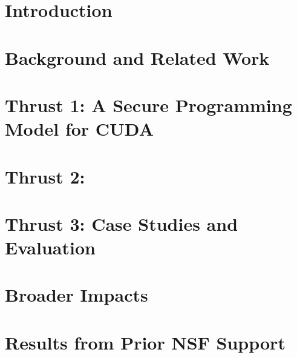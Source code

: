 \documentclass[11pt]{article}
\newif\ifsplit
\begin{document}







 




\section{Introduction}


\section{Background and Related Work}


\section{Thrust 1: A Secure Programming Model for CUDA}


\section{Thrust 2: }


\section{Thrust 3: Case Studies and Evaluation}


\section{Broader Impacts}


\section{Results from Prior NSF Support}


\ifsplit
\else
\FloatBarrier
\newpage



\fi
\end{document}
